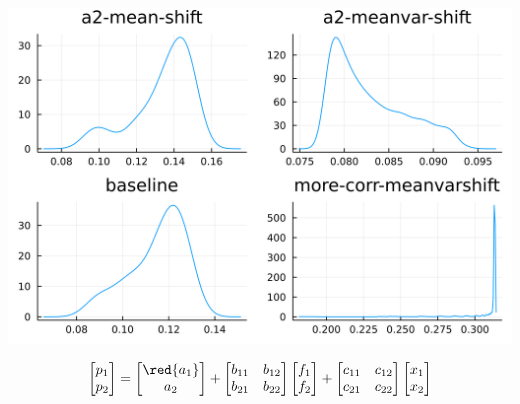 \documentclass[
  ignorenonframetext,
]{beamer}
\begin{document}
\begin{frame}{}
\protect\hypertarget{section-4}{}
\begin{center}\includegraphics[width=0.95\paperheight]{complexity_files/figure-beamer/unnamed-chunk-25-1} \end{center}

\[
\begin{bmatrix}
 p_1 \\ p_2
\end{bmatrix} =
\begin{bmatrix}
 \red{a_1} \\ a_2
\end{bmatrix}
 + 
 \begin{bmatrix}
 b_{11} & b_{12} \\
 b_{21} & b_{22}
\end{bmatrix}
\begin{bmatrix}
 f_1 \\ f_2
\end{bmatrix}
+
 \begin{bmatrix}
 c_{11} & c_{12} \\
 c_{21} & c_{22}
\end{bmatrix}
\begin{bmatrix}
 x_1 \\ x_2
\end{bmatrix}
\]
\end{frame}
\end{document}
